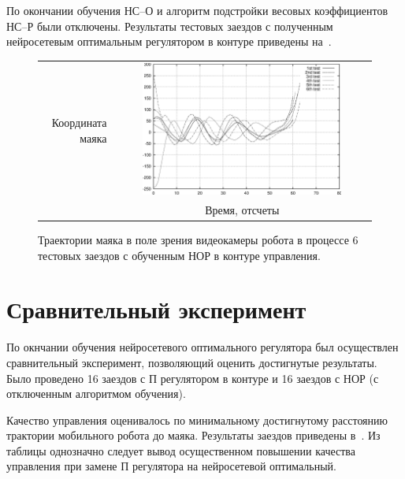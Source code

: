 По окончании обучения НС--О и алгоритм подстройки весовых
коэффициентов НС--Р были отключены.  Результаты тестовых заездов с
полученным нейросетевым оптимальным регулятором в контуре приведены
на~.

\begin{figure}
\centering
  \begin{tabular}{rc}
    \begin{sideways}
      {\hspace{3cm}\small Координата маяка}
    \end{sideways}
    &
    \includegraphics[width=0.8\textwidth,%
                     totalheight=0.35\textheight]{moby_fnnc_x01-06_test}\\
    & {\small Время, отсчеты} \\
\end{tabular}
\caption{Траектории маяка в поле зрения видеокамеры робота в процессе 6
тестовых заездов с обученным НОР в контуре управления.}
\label{fig:moby_fnnc_x01-06_test}
\end{figure}

\section{Сравнительный эксперимент}

По окнчании обучения нейросетевого оптимального регулятора был
осуществлен сравнительный эксперимент, позволяющий оценить достигнутые
результаты.  Было проведено 16 заездов с П регулятором в контуре и 16
заездов с НОР (с отключенным алгоритмом обучения).

Качество управления оценивалось по минимальному достигнутому
расстоянию трактории мобильного робота до маяка.  Результаты заездов
приведены в~.  Из таблицы однозначно
следует вывод осущественном повышении качества управления при замене
П регулятора на нейросетевой оптимальный.

